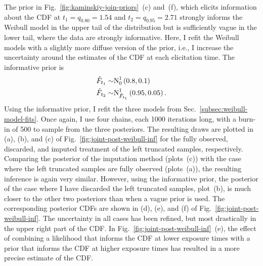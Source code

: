 The prior in Fig.~\ref{fig:kaminskiy-join-priors}~(c) and~(f), which elicits information about the CDF at $t_1 = q_{0.80} = 1.54$ and $t_2 = q_{0.95} = 2.71$ strongly informs the Weibull model in the upper tail of the distribution but is sufficiently vague in the lower tail, where the data are strongly informative. Here, I refit the Weibull models with a slightly more diffuse version of the prior, i.e., I increase the uncertainty around the estimates of the CDF at each elicitation time. The informative prior is
\begin{align*}
    \hat{F}_{t_1} \sim & \hbox{N}^{1}_{0}\left(0.8, 0.1\right)    \\
    \hat{F}_{t_2} \sim & \hbox{N}^{1}_{\hat{F}_{t_1}}\left(0.95, 0.05\right).
\end{align*}
Using the informative prior, I refit the three models from Sec.~\ref{subsec:weibull-model-fits}. Once again, I use four chains, each 1000 iterations long, with a burn-in of 500 to sample from the three posteriors. The resulting draws are plotted in (a), (b), and (c) of Fig.~\ref{fig:joint-post-weibull-inf} for the fully observed, discarded, and imputed treatment of the left truncated samples, respectively. Comparing the posterior of the imputation method (plots~(c)) with the case where the left truncated samples are fully observed (plots~(a)), the resulting inference is again very similar. However, using the informative prior, the posterior of the case where I have discarded the left truncated samples, plot~(b), is much closer to the other two posteriors than when a vague prior is used. The corresponding posterior CDFs are shown in (d), (e), and (f) of Fig.~\ref{fig:joint-post-weibull-inf}. The uncertainty in all cases has been refined, but most drastically in the upper right part of the CDF. In Fig.~\ref{fig:joint-post-weibull-inf}~(e), the effect of combining a likelihood that informs the CDF at lower exposure times with a prior that informs the CDF at higher exposure times has resulted in a more precise estimate of the CDF. 

